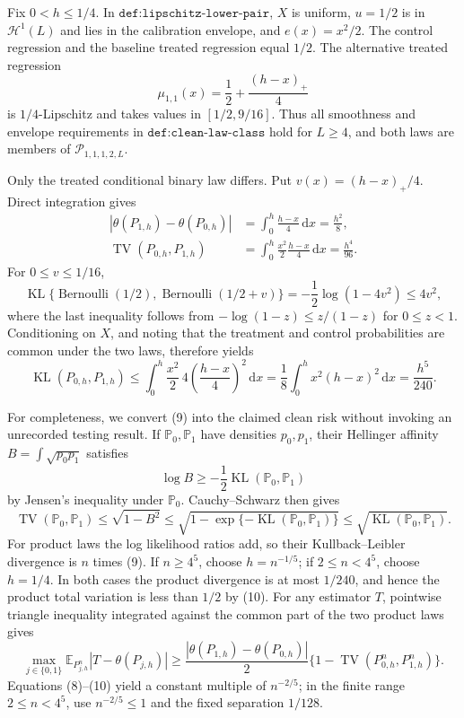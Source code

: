 Fix \(0<h\leq1/4\).  In \(\texttt{def:lipschitz-lower-pair}\), \(X\) is uniform, \(u=1/2\) is in \(\mathcal H^1(L)\) and lies in the calibration envelope, and \(e(x)=x^2/2\).  The control regression and the baseline treated regression equal \(1/2\).  The alternative treated regression
\[
 \mu_{1,1}(x)=\frac12+\frac{(h-x)_+}{4}
\]
is \(1/4\)-Lipschitz and takes values in \([1/2,9/16]\).  Thus all smoothness and envelope requirements in \(\texttt{def:clean-law-class}\) hold for \(L\geq4\), and both laws are members of \(\mathcal P_{1,1,1,2,L}\).

Only the treated conditional binary law differs.  Put \(v(x)=(h-x)_+/4\).  Direct integration gives
\[
 \begin{aligned}
 |\theta(P_{1,h})-\theta(P_{0,h})|
 &=\int_0^h\frac{h-x}{4}\,\mathrm dx=\frac{h^2}{8},\\
 \operatorname{TV}(P_{0,h},P_{1,h})
 &=\int_0^h\frac{x^2}{2}\frac{h-x}{4}\,\mathrm dx=\frac{h^4}{96}.
 \end{aligned}\tag{8}
\]
For \(0\leq v\leq1/16\),
\[
 \operatorname{KL}\{\operatorname{Bernoulli}(1/2),
                    \operatorname{Bernoulli}(1/2+v)\}
 =-\frac12\log(1-4v^2)\leq4v^2,
\]
where the last inequality follows from \(-\log(1-z)\leq z/(1-z)\) for \(0\leq z<1\).  Conditioning on \(X\), and noting that the treatment and control probabilities are common under the two laws, therefore yields
\[
 \operatorname{KL}(P_{0,h},P_{1,h})
 \leq\int_0^h\frac{x^2}{2}\,4\left(\frac{h-x}{4}\right)^2\,\mathrm dx
 =\frac18\int_0^h x^2(h-x)^2\,\mathrm dx
 =\frac{h^5}{240}. \tag{9}
\]

For completeness, we convert (9) into the claimed clean risk without invoking an unrecorded testing result.  If \(\mathbb P_0,\mathbb P_1\) have densities \(p_0,p_1\), their Hellinger affinity \(B=\int\sqrt{p_0p_1}\) satisfies
\[
 \log B\geq-\frac12\operatorname{KL}(\mathbb P_0,\mathbb P_1)
\]
by Jensen's inequality under \(\mathbb P_0\).  Cauchy--Schwarz then gives
\[
 \operatorname{TV}(\mathbb P_0,\mathbb P_1)
 \leq\sqrt{1-B^2}
 \leq\sqrt{1-\exp\{-\operatorname{KL}(\mathbb P_0,\mathbb P_1)\}}
 \leq\sqrt{\operatorname{KL}(\mathbb P_0,\mathbb P_1)}. \tag{10}
\]
For product laws the log likelihood ratios add, so their Kullback--Leibler divergence is \(n\) times (9).  If \(n\geq4^5\), choose \(h=n^{-1/5}\); if \(2\leq n<4^5\), choose \(h=1/4\).  In both cases the product divergence is at most \(1/240\), and hence the product total variation is less than \(1/2\) by (10).  For any estimator \(T\), pointwise triangle inequality integrated against the common part of the two product laws gives
\[
 \max_{j\in\{0,1\}}\mathbb E_{P_{j,h}^n}|T-\theta(P_{j,h})|
 \geq\frac{|\theta(P_{1,h})-\theta(P_{0,h})|}{2}
       \{1-\operatorname{TV}(P_{0,h}^n,P_{1,h}^n)\}.
\]
Equations (8)--(10) yield a constant multiple of \(n^{-2/5}\); in the finite range \(2\leq n<4^5\), use \(n^{-2/5}\leq1\) and the fixed separation \(1/128\).

